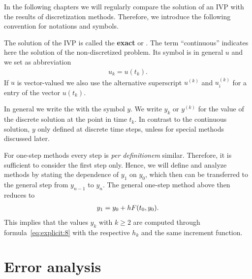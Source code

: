 \begin{definition}
  In the following chapters we will regularly compare the solution of
  an IVP with the results of discretization methods. Therefore, we
  introduce the following convention for notations and symbols.
  
   The solution
  of the IVP is called the \textbf{exact} or . The term ``continuous''
  indicates here the solution of the non-discretized problem. Its
  symbol is in general $u$ and we set as abbreviation
  \begin{gather*}
    u_k = u(t_k).
  \end{gather*}
  If $u$ is vector-valued we also use the alternative superscript
  $u^{(k)}$ and $u_i^{(k)}$ for a entry of the vector $u(t_k)$.

   In general we write the
   with the
  symbol $y$. We write $y_k$ or $y^{(k)}$ for the value of the
  discrete solution at the point in time $t_k$. In contrast to the
  continuous solution, $y$ only defined at discrete time steps, unless
  for special methods discussed later.
\end{definition}



\begin{remark}
  \label{remark:expl:first-step}
  For one-step methods every step is \emph{per definitionem} similar.
  Therefore, it is sufficient to consider the first step only.  Hence,
  we will define and analyze methods by stating the dependence of
  $y_1$ on $y_0$, which then can be transferred to the general step
  from $y_{n-1}$ to $y_{n}$. The general one-step method above then
  reduces to
  \begin{gather*}
    y_1 = y_0 + h F(t_0, y_0).
  \end{gather*}
  This implies that the values $y_k$ with $k\ge 2$ are computed
  through formula~\eqref{eq:explicit:8} with the respective $h_k$ and
  the same increment function.
\end{remark}



\section{Error analysis}

